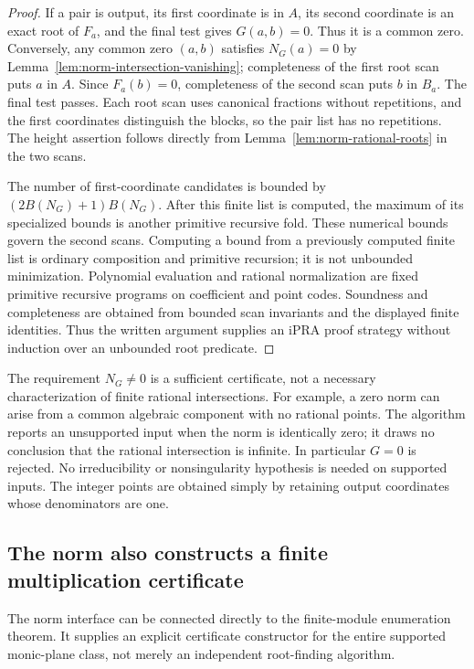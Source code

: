 \begin{proof}
If a pair is output, its first coordinate is in \(A\), its second
coordinate is an exact root of \(F_a\), and the final test gives
\(G(a,b)=0\).  Thus it is a common zero.  Conversely, any common
zero \((a,b)\) satisfies \(N_G(a)=0\) by
Lemma~\ref{lem:norm-intersection-vanishing}; completeness of the first
root scan puts \(a\) in \(A\).  Since \(F_a(b)=0\), completeness
of the second scan puts \(b\) in \(B_a\).  The final test passes.
Each root scan uses canonical fractions without repetitions, and
the first coordinates distinguish the blocks, so the pair list has
no repetitions.  The height assertion follows directly from
Lemma~\ref{lem:norm-rational-roots} in the two scans.

The number of first-coordinate candidates is bounded by
\((2B(N_G)+1)B(N_G)\).  After this finite list is computed, the
maximum of its specialized bounds is another primitive recursive
fold.  These numerical bounds govern the second scans.  Computing a
bound from a previously computed finite list is ordinary composition
and primitive recursion; it is not unbounded minimization.  Polynomial
evaluation and rational normalization are fixed primitive recursive
programs on coefficient and point codes.  Soundness and completeness
are obtained from bounded scan invariants and the displayed finite
identities.  Thus the written argument supplies an iPRA proof strategy
without induction over an unbounded root predicate.
\end{proof}

The requirement \(N_G\ne0\) is a sufficient certificate, not a
necessary characterization of finite rational intersections.
For example, a zero norm can arise from a common algebraic component
with no rational points.  The algorithm reports an unsupported input
when the norm is identically zero; it draws no conclusion that the
rational intersection is infinite.  In particular \(G=0\) is rejected.
No irreducibility or nonsingularity hypothesis is needed on supported
inputs.  The integer points are obtained simply by retaining output
coordinates whose denominators are one.

\subsection{The norm also constructs a finite multiplication certificate}
\label{sec:norm-to-module}

The norm interface can be connected directly to the finite-module
enumeration theorem.  It supplies an explicit certificate constructor
for the entire supported monic-plane class, not merely an independent
root-finding algorithm.


